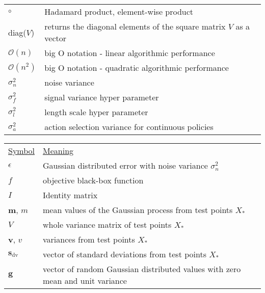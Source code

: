 \begin{tabular}{l l}
    $\circ$ & Hadamard product, element-wise product\\
    diag($V$) & returns the diagonal elements of the square matrix $V$ as a vector\\
    $\mathcal{O}(n)$ & big O notation - linear algorithmic performance\\
    $\mathcal{O}(n^2)$ & big O notation - quadratic algorithmic performance\\
    $\sigma_n^2$ & noise variance\\
    $\sigma_f^2$ & signal variance hyper parameter\\
    $\sigma_l^2$ & length scale hyper parameter\\
    $\sigma_a^2$ & action selection variance for continuous policies\\

\end{tabular}
\newpage
\begin{tabular}{l l}
    \underline{Symbol} & \underline{Meaning}\\
    $\epsilon$ & Gaussian distributed error with noise variance $\sigma_n^2$\\
    $f$ & objective black-box function\\
    $I$ & Identity matrix\\
    $\mathbf{m}$, $m$ & mean values of the Gaussian process from test points $X_*$\\
    $V$ & whole variance matrix of test points $X_*$\\
    $\mathbf{v}$, $v$ & variances from test points $X_*$\\
    $\mathbf{s}_\mathrm{dv}$ & vector of standard deviations from test points $X_*$\\
    $\mathbf{g}$ & vector of random Gaussian distributed values with zero mean and unit variance\\
\end{tabular}
